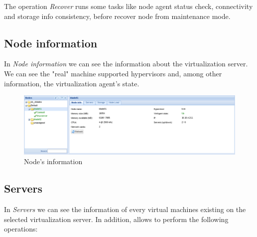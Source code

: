The operation \emph{Recover} runs some tasks like node agent status check, connectivity and storage info consistency, before recover node from maintenance mode.

\subsection{Node information}
\label{sec:nodeinfo}
In \emph{Node information} we can see the information about the virtualization server. We can see the "real" machine supported hypervisors and, among other information, the virtualization agent's state.

\begin{figure}[H]
	\begin{center}
	\includegraphics[scale=0.45]{screenshots/node_info.png}
	\caption{Node's information}
	\label{fig:node_info}
	\end{center}
\end{figure}

\subsection{Servers}
\label{sec:servers}
In \emph{Servers} we can see the information of every virtual machines existing on the selected virtualization server. In addition, allows to perform the following operations:

